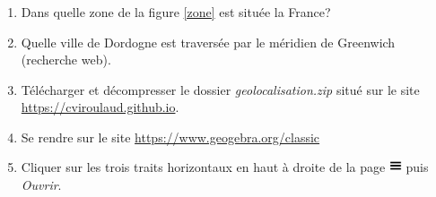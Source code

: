 \documentclass[svgnames,11pt]{beamer}
\begin{document}
\begin{frame}
    \frametitle{}

    \begin{activite}
        \begin{enumerate}
            \item Dans quelle zone de la figure \ref{zone} est située la France?
            \item Quelle ville de Dordogne est traversée par le méridien de Greenwich (recherche web).
            \item Télécharger et décompresser le dossier \emph{geolocalisation.zip} situé sur le site \url{https://cviroulaud.github.io}.
            \item Se rendre sur le site \url{https://www.geogebra.org/classic}
            \item Cliquer sur les trois traits horizontaux en haut à droite de la page \includegraphics[height=1em]{ressources/hamburger.png} puis \emph{Ouvrir}.

        \end{enumerate}
    \end{activite}
\end{frame}
\end{document}
